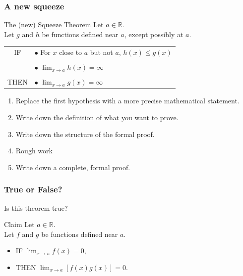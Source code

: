 \begin{frame}[t]
	\frametitle{A new squeeze}
	\fontsize{13}{13}\selectfont
	\begin{block}{The (new) Squeeze Theorem}
		Let $a \in \mathbb{R}$. \\ Let $g$ and $h$ be functions defined near $a$, except
		possibly at $a$.

		\vspace{.2cm}
		\begin{tabular}{cl}
			IF            & $\bullet$ {For $x$ close to $a$ but not $a$,} \; $\displaystyle %
h(x) \leq g(x)$ \\
			\vspace{-.2cm} \\
			              & $\bullet$ $\displaystyle \lim_{x \to a}h(x) = \infty$                                                                                      \\
			\vspace{-.1cm} \\
			THEN          & $\bullet$ $\displaystyle \lim_{x \to a}g(x) = \infty$
		\end{tabular}
	\end{block}

	\begin{enumerate}

		\item Replace the first hypothesis with a more precise mathematical statement.

		\item Write down the definition of what you want to prove.

		\item Write down the structure of the formal proof.

		\item Rough work

		\item Write down a complete, formal proof.
	\end{enumerate}
\end{frame}

\begin{frame}
	\frametitle{True or False?}

	\vfill

	Is this theorem true?

	\vfill

	\begin{block}{Claim}
		Let $a \in \mathbb{R}$. \\ Let $f$ and $g$ be functions defined near $a$. \\
		\begin{itemize}
			\item IF $\displaystyle \lim_{x \to a}f(x) = 0$,

			\item THEN $\displaystyle \lim_{x \to a}\left[ f(x) g(x) \right] = 0$.
		\end{itemize}
	\end{block}

	\vfill
\end{frame}

